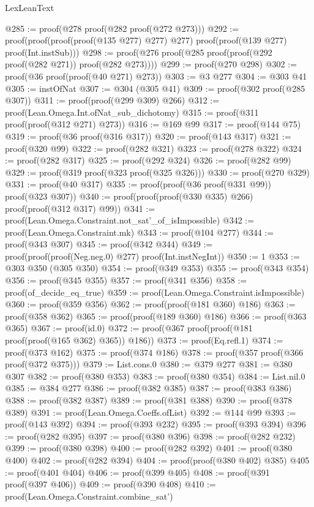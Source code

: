 \begin{lexlean}{LexLeanText}
\begin{coremodule}
@285 := proof(@278 proof(@282 proof(@272 @273)))
@292 := proof(proof(proof(proof(@135 @277) @277) @277) proof(proof(@139 @277) proof(Int.instSub)))
@298 := proof(@276 proof(@285 proof(proof(@292 proof(@282 @271)) proof(@282 @273))))
@299 := proof(@270 @298)
@302 := proof(@36 proof(proof(@40 @271) @273))
@303 := @3 @277
@304 := @303 @41
@305 := instOfNat
@307 := @304 (@305 @41)
@309 := proof(@302 proof(@285 @307))
@311 := proof(proof(@299 @309) @266)
@312 := proof(Lean.Omega.Int.ofNat_sub_dichotomy)
@315 := proof(@311 proof(proof(@312 @271) @273))
@316 := @169 @99
@317 := proof(@144 @75)
@319 := proof(@36 proof(@316 @317))
@320 := proof(@143 @317)
@321 := proof(@320 @99)
@322 := proof(@282 @321)
@323 := proof(@278 @322)
@324 := proof(@282 @317)
@325 := proof(@292 @324)
@326 := proof(@282 @99)
@329 := proof(@319 proof(@323 proof(@325 @326)))
@330 := proof(@270 @329)
@331 := proof(@40 @317)
@335 := proof(proof(@36 proof(@331 @99)) proof(@323 @307))
@340 := proof(proof(proof(@330 @335) @266) proof(proof(@312 @317) @99))
@341 := proof(Lean.Omega.Constraint.not_sat'_of_isImpossible)
@342 := proof(Lean.Omega.Constraint.mk)
@343 := proof(@104 @277)
@344 := proof(@343 @307)
@345 := proof(@342 @344)
@349 := proof(proof(proof(Neg.neg.{0}) @277) proof(Int.instNegInt))
@350 := 1
@353 := @303 @350 (@305 @350)
@354 := proof(@349 @353)
@355 := proof(@343 @354)
@356 := proof(@345 @355)
@357 := proof(@341 @356)
@358 := proof(of_decide_eq_true)
@359 := proof(Lean.Omega.Constraint.isImpossible)
@360 := proof(@359 @356)
@362 := proof(proof(@181 @360) @186)
@363 := proof(@358 @362)
@365 := proof(proof(@189 @360) @186)
@366 := proof(@363 @365)
@367 := proof(id.{0})
@372 := proof(@367 proof(proof(@181 proof(proof(@165 @362) @365)) @186))
@373 := proof(Eq.refl.{1})
@374 := proof(@373 @162)
@375 := proof(@374 @186)
@378 := proof(@357 proof(@366 proof(@372 @375)))
@379 := List.cons.{0}
@380 := @379 @277
@381 := @380 @307
@382 := proof(@380 @353)
@383 := proof(@380 @354)
@384 := List.nil.{0}
@385 := @384 @277
@386 := proof(@382 @385)
@387 := proof(@383 @386)
@388 := proof(@382 @387)
@389 := proof(@381 @388)
@390 := proof(@378 @389)
@391 := proof(Lean.Omega.Coeffs.ofList)
@392 := @144 @99
@393 := proof(@143 @392)
@394 := proof(@393 @232)
@395 := proof(@393 @394)
@396 := proof(@282 @395)
@397 := proof(@380 @396)
@398 := proof(@282 @232)
@399 := proof(@380 @398)
@400 := proof(@282 @392)
@401 := proof(@380 @400)
@402 := proof(@282 @394)
@404 := proof(proof(@380 @402) @385)
@405 := proof(@401 @404)
@406 := proof(@399 @405)
@408 := proof(@391 proof(@397 @406))
@409 := proof(@390 @408)
@410 := proof(Lean.Omega.Constraint.combine_sat')

\end{coremodule}
\end{lexlean}
